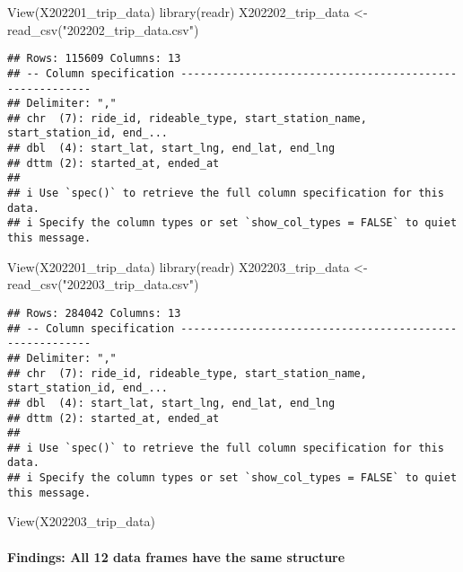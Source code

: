 \documentclass[
]{article}
\newenvironment{Shaded}{\begin{snugshade}}{\end{snugshade}}
\newcommand{\FunctionTok}[1]{\textcolor[rgb]{0.00,0.00,0.00}{#1}}
\newcommand{\NormalTok}[1]{#1}
\newcommand{\OtherTok}[1]{\textcolor[rgb]{0.56,0.35,0.01}{#1}}
\newcommand{\StringTok}[1]{\textcolor[rgb]{0.31,0.60,0.02}{#1}}
\begin{document}
\begin{Shaded}
\begin{Highlighting}[]
\FunctionTok{View}\NormalTok{(X202201\_trip\_data)}
\FunctionTok{library}\NormalTok{(readr)}
\NormalTok{X202202\_trip\_data }\OtherTok{\textless{}{-}} \FunctionTok{read\_csv}\NormalTok{(}\StringTok{"202202\_trip\_data.csv"}\NormalTok{)}
\end{Highlighting}
\end{Shaded}

\begin{verbatim}
## Rows: 115609 Columns: 13
## -- Column specification --------------------------------------------------------
## Delimiter: ","
## chr  (7): ride_id, rideable_type, start_station_name, start_station_id, end_...
## dbl  (4): start_lat, start_lng, end_lat, end_lng
## dttm (2): started_at, ended_at
## 
## i Use `spec()` to retrieve the full column specification for this data.
## i Specify the column types or set `show_col_types = FALSE` to quiet this message.
\end{verbatim}

\begin{Shaded}
\begin{Highlighting}[]
\FunctionTok{View}\NormalTok{(X202201\_trip\_data)}
\FunctionTok{library}\NormalTok{(readr)}
\NormalTok{X202203\_trip\_data }\OtherTok{\textless{}{-}} \FunctionTok{read\_csv}\NormalTok{(}\StringTok{"202203\_trip\_data.csv"}\NormalTok{)}
\end{Highlighting}
\end{Shaded}

\begin{verbatim}
## Rows: 284042 Columns: 13
## -- Column specification --------------------------------------------------------
## Delimiter: ","
## chr  (7): ride_id, rideable_type, start_station_name, start_station_id, end_...
## dbl  (4): start_lat, start_lng, end_lat, end_lng
## dttm (2): started_at, ended_at
## 
## i Use `spec()` to retrieve the full column specification for this data.
## i Specify the column types or set `show_col_types = FALSE` to quiet this message.
\end{verbatim}

\begin{Shaded}
\begin{Highlighting}[]
\FunctionTok{View}\NormalTok{(X202203\_trip\_data)}
\end{Highlighting}
\end{Shaded}

\hypertarget{findings-all-12-data-frames-have-the-same-structure}{%
\paragraph{Findings: All 12 data frames have the same
structure}\label{findings-all-12-data-frames-have-the-same-structure}}
\end{document}
